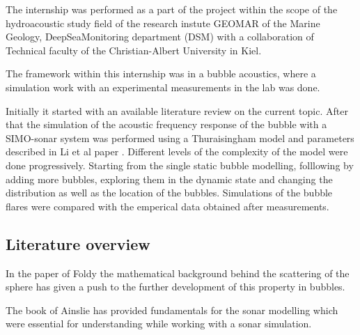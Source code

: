 The internship was performed as a part of the project within the scope of the hydroacoustic study field of the research instute GEOMAR of the Marine Geology, DeepSeaMonitoring department (DSM) with a collaboration of Technical faculty of the Christian-Albert University in Kiel. 

The framework within this internship was in a bubble acoustics, where a simulation work with an experimental measurements in the lab was done. 

Initially it started with an available literature review on the current topic. After that the simulation of the acoustic frequency response of the bubble with a SIMO-sonar system was performed using a Thuraisingham model and parameters described in Li et al paper \cite{li_broadband_2020}. Different levels of the complexity of the model were done progressively. Starting from the single static bubble modelling, folllowing by adding more bubbles, exploring them in the dynamic state and changing the distribution as well as the location of the bubbles. Simulations of the bubble flares were compared with the emperical data obtained after measurements.



\subsection{Literature overview} 

In the paper of Foldy the mathematical background behind the scattering of the sphere has given a push to the further development of this property in bubbles.

The book of Ainslie has provided fundamentals for the sonar modelling which were essential for understanding while working with a sonar simulation. 




